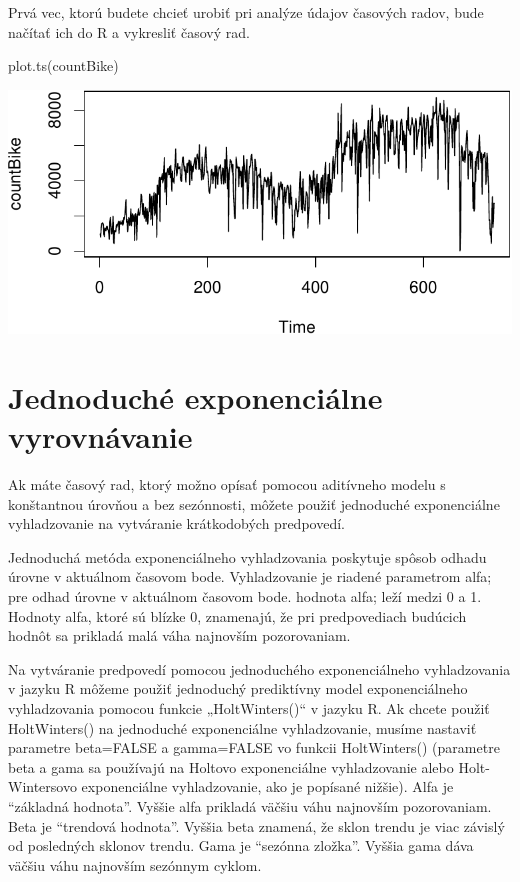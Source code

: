 \documentclass[
  letterpaper,
  DIV=11,
  numbers=noendperiod]{scrreprt}
\newenvironment{Shaded}{\begin{snugshade}}{\end{snugshade}}
\newcommand{\FunctionTok}[1]{\textcolor[rgb]{0.28,0.35,0.67}{#1}}
\newcommand{\NormalTok}[1]{\textcolor[rgb]{0.00,0.23,0.31}{#1}}
\begin{document}
Prvá vec, ktorú budete chcieť urobiť pri analýze údajov časových radov,
bude načítať ich do R a vykresliť časový rad.

\begin{Shaded}
\begin{Highlighting}[]
\FunctionTok{plot.ts}\NormalTok{(countBike)}
\end{Highlighting}
\end{Shaded}

\includegraphics{prednaska2_HoltWinters_files/figure-pdf/unnamed-chunk-2-1.pdf}

\section{Jednoduché exponenciálne
vyrovnávanie}\label{jednoduchuxe9-exponenciuxe1lne-vyrovnuxe1vanie}

Ak máte časový rad, ktorý možno opísať pomocou aditívneho modelu s
konštantnou úrovňou a bez sezónnosti, môžete použiť jednoduché
exponenciálne vyhladzovanie na vytváranie krátkodobých predpovedí.

Jednoduchá metóda exponenciálneho vyhladzovania poskytuje spôsob odhadu
úrovne v aktuálnom časovom bode. Vyhladzovanie je riadené parametrom
alfa; pre odhad úrovne v aktuálnom časovom bode. hodnota alfa; leží
medzi 0 a 1. Hodnoty alfa, ktoré sú blízke 0, znamenajú, že pri
predpovediach budúcich hodnôt sa prikladá malá váha najnovším
pozorovaniam.

Na vytváranie predpovedí pomocou jednoduchého exponenciálneho
vyhladzovania v jazyku R môžeme použiť jednoduchý prediktívny model
exponenciálneho vyhladzovania pomocou funkcie „HoltWinters()`` v jazyku
R. Ak chcete použiť HoltWinters() na jednoduché exponenciálne
vyhladzovanie, musíme nastaviť parametre beta=FALSE a gamma=FALSE vo
funkcii HoltWinters() (parametre beta a gama sa používajú na Holtovo
exponenciálne vyhladzovanie alebo Holt-Wintersovo exponenciálne
vyhladzovanie, ako je popísané nižšie). Alfa je ``základná hodnota''.
Vyššie alfa prikladá väčšiu váhu najnovším pozorovaniam. Beta je
``trendová hodnota''. Vyššia beta znamená, že sklon trendu je viac
závislý od posledných sklonov trendu. Gama je ``sezónna zložka''. Vyššia
gama dáva väčšiu váhu najnovším sezónnym cyklom.
\end{document}

